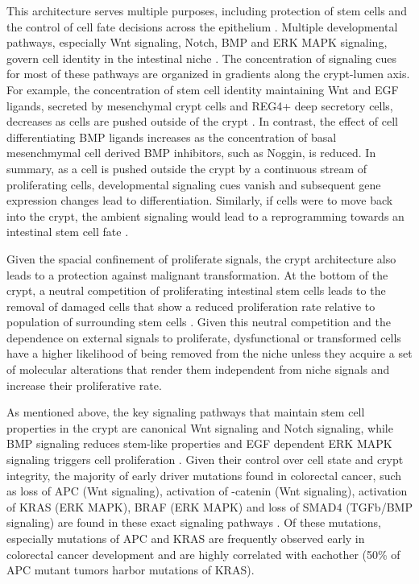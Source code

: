 \begin{flushleft}
This architecture serves multiple purposes, including protection of stem cells and the control of cell fate decisions across the epithelium \cite{cleversIntestinalCryptPrototype2013a}. Multiple developmental pathways, especially Wnt signaling, Notch, BMP and ERK MAPK signaling, govern cell identity in the intestinal niche \cite{Gehart2019}. The concentration of signaling cues for most of these pathways are organized in gradients along the crypt-lumen axis. For example, the concentration of stem cell identity maintaining Wnt and EGF ligands, secreted by mesenchymal crypt cells and REG4+ deep secretory cells, decreases as cells are pushed outside of the crypt  \cite{Sasaki2016}. In contrast, the effect of cell differentiating BMP ligands increases as the concentration of basal mesenchmymal cell derived BMP inhibitors, such as Noggin, is reduced. In summary, as a cell is pushed outside the crypt by a continuous stream of proliferating cells, developmental signaling cues vanish and subsequent gene expression changes lead to differentiation. Similarly, if cells were to move back into the crypt, the ambient signaling would lead to a reprogramming towards an intestinal stem cell fate \cite{tettehReplacementLostLgr5Positive2016a}. \par

Given the spacial confinement of proliferate signals, the crypt architecture also leads to a protection against malignant transformation. At the bottom of the crypt, a neutral competition of proliferating intestinal stem cells leads to the removal of damaged cells that show a reduced proliferation rate relative to population of surrounding stem cells \cite{snippertIntestinalCryptHomeostasis2010a}. Given this neutral competition and the dependence on external signals to proliferate, dysfunctional or transformed cells have a higher likelihood of being removed from the niche unless they acquire a set of molecular alterations that render them independent from niche signals and increase their proliferative rate. \par

As mentioned above, the key signaling pathways that maintain stem cell properties in the crypt are canonical Wnt signaling and Notch signaling, while BMP signaling reduces stem-like properties and EGF dependent ERK MAPK signaling triggers cell proliferation \cite{cleversIntestinalCryptPrototype2013a}. Given their control over cell state and crypt integrity, the majority of early driver mutations found in colorectal cancer, such as loss of APC (Wnt signaling), activation of \textbeta-catenin (Wnt signaling), activation of KRAS (ERK MAPK), BRAF (ERK MAPK) and loss of SMAD4 (TGFb/BMP signaling) are found in these exact signaling pathways \cite{fearonMolecularGeneticsColorectal2011}. Of these mutations, especially mutations of APC and KRAS are frequently observed early in colorectal cancer development and are highly correlated with eachother (50\% of APC mutant tumors harbor mutations of KRAS). \par


\end{flushleft}
